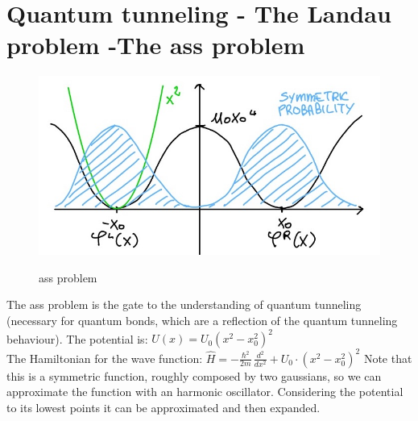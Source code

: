 \section{Quantum tunneling - The Landau problem -The ass problem}
\begin{figure}[htbp!]
	\centering
	\includegraphics[scale=0.30]{img_2.jpg}
	\label{fig:ass}
	\caption{ass problem}
\end{figure}
The ass problem is the gate to the understanding of quantum tunneling (necessary for quantum bonds, which are a reflection of the quantum tunneling behaviour). 
The potential is: $U(x)=U_0(x^2-x_0^2)^2$\\

The Hamiltonian for the wave function: $\hat{H}=-\frac{\hbar^2}{2m}\,\frac{d^2}{dx^2}+U_0\cdot(x^2-x_0^2)^2$
Note that this is a symmetric function, roughly composed by two gaussians, so we can approximate the function with an harmonic oscillator. Considering the potential to its lowest points it can be approximated and then expanded. \\

